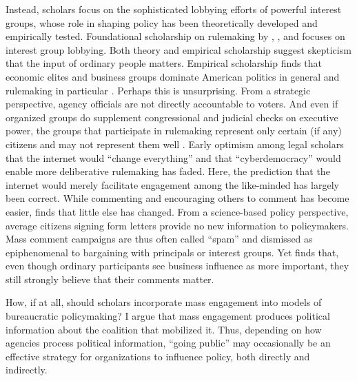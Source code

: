 Instead, scholars focus on the sophisticated lobbying efforts of powerful interest groups, whose role in shaping policy has been theoretically developed and empirically tested.
Foundational scholarship on rulemaking by \citet{Furlong2004}, \citet{Furlong1997, Furlong1998}, and \citet{Kerwin2011} focuses on interest group lobbying. Both theory and empirical scholarship suggest skepticism that the input of ordinary people matters. 
Empirical scholarship finds that economic elites and business groups dominate American politics in general \citep{Gilens2014} and rulemaking in particular \citep{Crow2015, Wagner2011, West2009, Yackee2006JOP, Yackee2006JPART, Yackee2012, Golden1998, Haeder2015}. Perhaps this is unsurprising. 
From a strategic perspective, agency officials are not directly accountable to voters. And even if organized groups do supplement congressional and judicial checks on executive power, the groups that participate in rulemaking represent only certain (if any) citizens and may not represent them well \citep{Seifter2016UCLA}. Early optimism among legal scholars that the internet would ``change everything'' \citep{Johnson1998} and that ``cyberdemocracy''  would enable more deliberative rulemaking has faded.  Here, the prediction that the internet would merely facilitate engagement among the like-minded \citep{Sunstein2001} has largely been correct. While commenting and encouraging others to comment has become easier, \citet{Coglianese2006} finds that little else has changed. 
From a science-based policy perspective, average citizens signing form letters provide no new information to policymakers. 
Mass comment campaigns are thus often called ``spam'' \citep{Balla2018} and dismissed as epiphenomenal to bargaining with principals or interest groups. 
Yet \citet{Yackee2015JPART} finds that, even though ordinary participants see business influence as more important, they still strongly believe that their comments matter.

How, if at all, should scholars incorporate mass engagement into models of bureaucratic policymaking? 
I argue that mass engagement produces political information about the coalition that mobilized it.
Thus, depending on how agencies process political information, ``going public'' may occasionally be an effective strategy for organizations to influence policy, both directly and indirectly.

